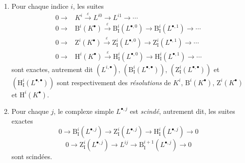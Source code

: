 \begin{enumerate}
  \item[(i)] Pour chaque indice $i$, les suites
    \[
    \begin{aligned}
      0\longrightarrow{}&K^i\xrightarrow{\varepsilon}L^{i0}
        \longrightarrow L^{i1}\longrightarrow\cdots\\
      0\longrightarrow{}&\mathrm B^i(K^\bullet)\xrightarrow{\varepsilon}
        \mathrm B_{\mathrm I}^i(L^{\bullet,0})
        \longrightarrow\mathrm B_{\mathrm I}^i(L^{\bullet,1})
        \longrightarrow\cdots\\
      0\longrightarrow{}&\mathrm Z^i(K^\bullet)\xrightarrow{\varepsilon}
        \mathrm Z_{\mathrm I}^i(L^{\bullet,0})
        \longrightarrow\mathrm Z_{\mathrm I}^i(L^{\bullet,1})
        \longrightarrow\cdots\\
      0\longrightarrow{}&\mathrm H^i(K^\bullet)\xrightarrow{\varepsilon}
        \mathrm H_{\mathrm I}^i(L^{\bullet,0})
        \longrightarrow\mathrm H_{\mathrm I}^i(L^{\bullet,1})
        \longrightarrow\cdots
    \end{aligned}
    \]
    sont exactes, autrement dit $(L^{i,\bullet})$,
    $(\mathrm B_{\mathrm I}^i(L^{\bullet,\bullet}))$,
    $(\mathrm Z_{\mathrm I}^i(L^{\bullet,\bullet}))$ et
    $(\mathrm H_{\mathrm I}^i(L^{\bullet,\bullet}))$ sont respectivement
    des \emph{résolutions} de $K^i$, $\mathrm B^i(K^\bullet)$,
    $\mathrm Z^i(K^\bullet)$ et $\mathrm H^i(K^\bullet)$.
  \item[(ii)] Pour chaque $j$, le complexe simple $L^{\bullet,j}$ est
    \emph{scindé}, autrement dit, les suites exactes
    \[
      \label{0.11.4.2.1-fr}
      0\longrightarrow\mathrm B_{\mathrm I}^i(L^{\bullet,j})
      \longrightarrow\mathrm Z_{\mathrm I}^i(L^{\bullet,j})
      \longrightarrow\mathrm H_{\mathrm I}^i(L^{\bullet,j})
      \longrightarrow0
      \tag{11.4.2.1}
    \]
    \[
      \label{0.11.4.2.2-fr}
      0\longrightarrow\mathrm Z_{\mathrm I}^i(L^{\bullet,j})
      \longrightarrow L^{ij}
      \longrightarrow\mathrm B_{\mathrm I}^{i+1}(L^{\bullet,j})
      \longrightarrow0
      \tag{11.4.2.2}
    \]
    sont scindées.
\end{enumerate}

